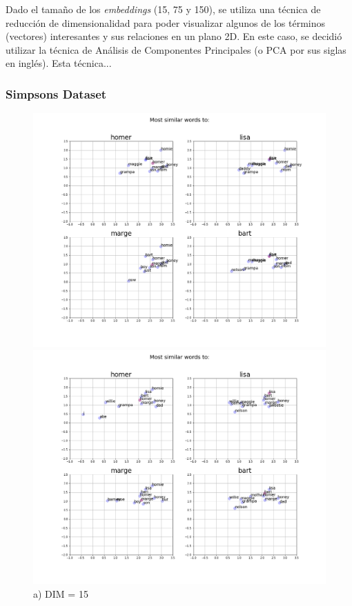 Dado el tamaño de los \textit{embeddings} (15, 75 y 150), se utiliza una técnica de reducción de dimensionalidad para poder visualizar algunos de los términos (vectores) interesantes y sus relaciones en un plano 2D. En este caso, se decidió utilizar la técnica de Análisis de Componentes Principales (o PCA por sus siglas en inglés). Esta técnica...

\subsubsection{Simpsons Dataset}

\begin{figure}[H]

\centering
\begin{minipage}{0.47\textwidth}
\includegraphics[trim=4.2cm 3cm 3.7cm 2.7cm, clip=true, width=\textwidth]{results/embeddings/simpsons_similar_15.png}
\caption*{a) DIM = 15}
\end{minipage}\hfill
\begin{minipage}{0.47\textwidth}
\includegraphics[trim=4.2cm 3cm 3.7cm 2.7cm, clip=true, width=\textwidth]{results/embeddings/simpsons_similar_75.png}

\end{minipage}
\end{figure}
